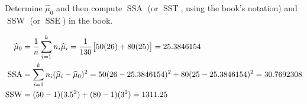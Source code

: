 Determine $\widehat{\mu}_0$ and then compute $\operatorname{SSA}$ (or $\operatorname{SST}$, using the book's notation) and $\operatorname{SSW}$ (or $\operatorname{SSE}$) in the book.

\soln* 
\begin{align*}
    \muh_0 &= \over{n} \sum_{i=1}^{k} n_i \muh_i = \over{130} \bigbrac{50(26)+80(25)} = 25.3846154\\
    \operatorname{SSA} &= \sum_{i=1}^k n_i (\muh_i - \muh_0)^2 = 50 (26 - 25.3846154)^2 + 80 (25 - 25.3846154)^2 = 30.7692308\\
    \operatorname{SSW} &= (50 - 1)(3.5^2) + (80-1)(3^2) = 1311.25\\
\end{align*}